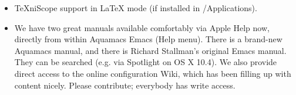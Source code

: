 \begin{itemize}
\item TeXniScope support in LaTeX mode (if installed in /Applications).

        \item We have two great manuals available comfortably via Apple Help  now,
    directly from within Aquamacs Emacs (Help menu). There is a
    brand-new Aquamacs manual, and there is Richard
    Stallman's original Emacs manual. They can be searched (e.g. via
    Spotlight on OS X 10.4). We also provide direct access to the online configuration Wiki, which has been filling up with content nicely.  Please contribute; everybody has write access.

\end{itemize}



